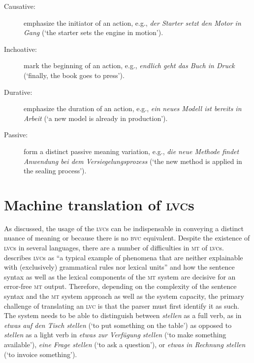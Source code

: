 \documentclass[output=paper]{langsci/langscibook}
\begin{document}
\begin{description}
\item [Causative:] emphasize the initiator of an action, e.g., \textit{der Starter setzt den Motor in Gang} (`the starter sets the engine in motion').

\item [Inchoative:] mark the beginning of an action, e.g., \textit{endlich geht das Buch in Druck} (`finally, the book goes to press').

\item [Durative:] emphasize the duration of an action, e.g., \textit{ein neues Modell ist bereits in Arbeit} (`a new model is already in production').

\item [Passive:] form a distinct passive meaning variation, e.g., \textit{die neue Methode findet Anwendung bei dem Versiegelungsprozess} (`the new method is applied in the sealing process').
\end{description}

\section{Machine translation of \textsc{lvc}s}
As discussed, the usage of the \textsc{lvc}s can be indispensable in conveying a distinct nuance of meaning or because there is no \textsc{bvc} equivalent. Despite the existence of \textsc{lvc}s in several languages, there are a number of difficulties in \textsc{mt} of \textsc{lvc}s. \citet{Heine2017} describes \textsc{lvc}s as “a typical example of phenomena that are neither explainable with (exclusively) grammatical rules nor lexical units” and how the sentence syntax as well as the lexical components of the \textsc{mt} system are decisive for an error-free \textsc{mt} output. Therefore, depending on the complexity of the sentence syntax and the \textsc{mt} system approach as well as the system capacity, the primary challenge of translating an \textsc{lvc} is that the parser must first identify it as such. The system needs to be able to distinguish between \textit{stellen} as a full verb, as in \textit{etwas auf den Tisch stellen} (`to put something on the table') as opposed to \textit{stellen} as a light verb in \textit{etwas zur Verfügung stellen} (`to make something available'), \textit{eine Frage stellen} (`to ask a question'), or \textit{etwas in Rechnung stellen} (`to invoice something').
\end{document}
